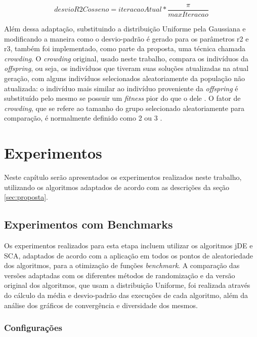 \begin{equation}
    \label{eq:desvioR2Cos}
    desvioR2Cosseno = iteracaoAtual * \frac{\pi}{maxIteracao}
\end{equation}

Além dessa adaptação, substituindo a distribuição Uniforme pela Gaussiana e modificando a maneira como o desvio-padrão é gerado para os parâmetros r2 e r3, também foi implementado, como parte da proposta, uma técnica chamada \textit{crowding}. O \textit{crowding} original, usado neste trabalho, compara os indivíduos da \textit{offspring}, ou seja, os indivíduos que tiveram suas soluções atualizadas na atual geração, com alguns indivíduos selecionados aleatoriamente da população não atualizada: o indivíduo mais similar ao indivíduo proveniente da \textit{offspring} é substituído pelo mesmo se possuir um \textit{fitness} pior do que o dele \cite{kundu}. O fator de \textit{crowding}, que se refere ao tamanho do grupo selecionado aleatoriamente para comparação, é normalmente definido como 2 ou 3 \cite{kundu}.

\chapter{Experimentos}

Neste capítulo serão apresentados os experimentos realizados neste trabalho, utilizando os algoritmos adaptados de acordo com as descrições da seção \ref{sec:proposta}.

\section{Experimentos com Benchmarks}
\label{sec:expBenchmarks}

Os experimentos realizados para esta etapa incluem utilizar os algoritmos jDE e SCA, adaptados de acordo com a aplicação em todos os pontos de aleatoriedade dos algoritmos, para a otimização de funções \textit{benchmark}. A comparação das versões adaptadas com os diferentes métodos de randomização e da versão original dos algoritmos, que usam a distribuição Uniforme, foi realizada através do cálculo da média e desvio-padrão das execuções de cada algoritmo, além da análise dos gráficos de convergência e diversidade dos mesmos.

\subsection{Configurações}

